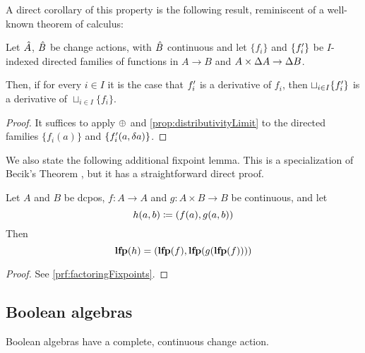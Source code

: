 A direct corollary of this property is the following result, reminiscent of a well-known theorem of calculus:

\begin{corollary}
  \label{cor:diffContinuous}
  Let $\hat{A}$, $\hat{B}$ be change actions, with $\hat{B}$ continuous and let $\{f_i\}$ and $\{f_i'\}$ be
  $I$-indexed directed families of functions in $A \rightarrow B$ and $A \times \Delta A \rightarrow \Delta B$.

  Then, if for every $i \in I$ it is the case that $f_i'$ is a derivative of $f_i$, then $\sqcup_{i \in I} \{ f_i' \}$ is
  a derivative of $\sqcup_{i \in I} \{ f_i \}$.
\end{corollary}
\ifproofs
\begin{proof}
  It suffices to apply $\oplus$ and \cref{prop:distributivityLimit} to the directed families $\{ f_i(a) \}$ and
  $\{ f_i'(a, \delta a) \}$.
\end{proof}
\fi

We also state the following additional fixpoint lemma. This is a specialization of
Becik's Theorem \autocite[][section 10.1]{winskel1993formal}, but it has a straightforward direct proof.

\begin{prop}[name=Factoring of fixpoints, restate=factoringFixpoints]
  \label{prop:factoringFixpoints}
  Let $A$ and $B$ be dcpos, $f : A \rightarrow A$ and $g: A \times B \rightarrow B$ be continuous, and let
  \begin{displaymath}
    h(a, b) \coloneqq (f(a), g(a, b))
  \end{displaymath}
  Then
  \begin{displaymath}
    \textbf{lfp}(h) = (\textbf{lfp}(f), \textbf{lfp}(g(\textbf{lfp}(f))))
  \end{displaymath}
\end{prop}
\ifproofs
\begin{proof}
  See \cref{prf:factoringFixpoints}.
\end{proof}
\fi

\subsection{Boolean algebras}
\label{sec:booleanAlgebras}

Boolean algebras have a complete, continuous change action.

